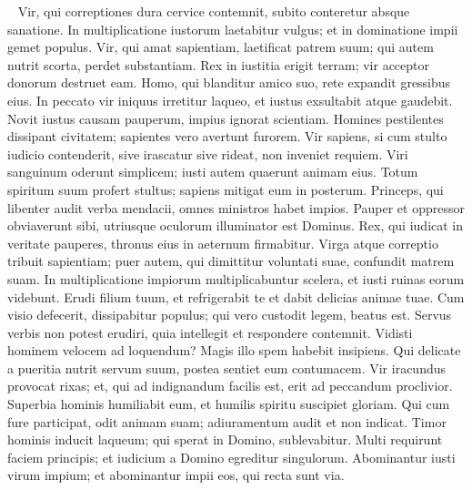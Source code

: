 \begin{biblechapter}   
\verse Vir, qui correptiones dura cervice contemnit, subito conteretur absque sanatione. 
\verse In multiplicatione iustorum laetabitur vulgus; et in dominatione impii gemet populus. 
\verse Vir, qui amat sapientiam, laetificat patrem suum; qui autem nutrit scorta, perdet substantiam. 
\verse Rex in iustitia erigit terram; vir acceptor donorum destruet eam. 
\verse Homo, qui blanditur amico suo, rete expandit gressibus eius. 
\verse In peccato vir iniquus irretitur laqueo, et iustus exsultabit atque gaudebit. 
\verse Novit iustus causam pauperum, impius ignorat scientiam. 
\verse Homines pestilentes dissipant civitatem; sapientes vero avertunt furorem. 
\verse Vir sapiens, si cum stulto iudicio contenderit, sive irascatur sive rideat, non inveniet requiem. 
\verse Viri sanguinum oderunt simplicem; iusti autem quaerunt animam eius. 
\verse Totum spiritum suum profert stultus; sapiens mitigat eum in posterum. 
\verse Princeps, qui libenter audit verba mendacii, omnes ministros habet impios. 
\verse Pauper et oppressor obviaverunt sibi, utriusque oculorum illuminator est Dominus. 
\verse Rex, qui iudicat in veritate pauperes, thronus eius in aeternum firmabitur. 
\verse Virga atque correptio tribuit sapientiam; puer autem, qui dimittitur voluntati suae, confundit matrem suam. 
\verse In multiplicatione impiorum multiplicabuntur scelera, et iusti ruinas eorum videbunt. 
\verse Erudi filium tuum, et refrigerabit te et dabit delicias animae tuae. 
\verse Cum visio defecerit, dissipabitur populus; qui vero custodit legem, beatus est. 
\verse Servus verbis non potest erudiri, quia intellegit et respondere contemnit. 
\verse Vidisti hominem velocem ad loquendum? Magis illo spem habebit insipiens. 
\verse Qui delicate a pueritia nutrit servum suum, postea sentiet eum contumacem. 
\verse Vir iracundus provocat rixas; et, qui ad indignandum facilis est, erit ad peccandum proclivior. 
\verse Superbia hominis humiliabit eum, et humilis spiritu suscipiet gloriam. 
\verse Qui cum fure participat, odit animam suam; adiuramentum audit et non indicat. 
\verse Timor hominis inducit laqueum; qui sperat in Domino, sublevabitur. 
\verse Multi requirunt faciem principis; et iudicium a Domino egreditur singulorum. 
\verse Abominantur iusti virum impium; et abominantur impii eos, qui recta sunt via. 
\end{biblechapter}

